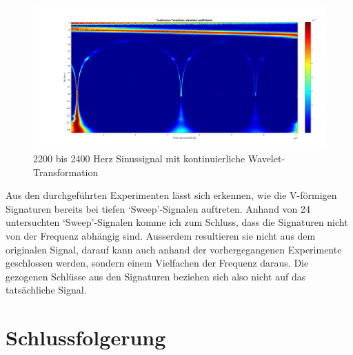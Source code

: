 \begin{refsection}
\begin{figure}[h]
	\includegraphics[width=0.9\linewidth]{papers/meteor/images/anomalie/sweep/cwt_2200to2400hz.png}
	\caption{2200 bis 2400 Herz Sinussignal mit kontinuierliche Wavelet-Transformation}
	\label{fig:cwt_anomalie_beam_2}
\end{figure}
Aus den durchgeführten Experimenten lässt sich erkennen, wie die V-förmigen Signaturen bereits bei tiefen `Sweep'-Signalen auftreten.
Anhand von 24 untersuchten `Sweep'-Signalen komme ich zum Schluss, dass die Signaturen nicht von der Frequenz abhängig sind.
Ausserdem resultieren sie nicht aus dem originalen Signal, darauf kann auch anhand der vorhergegangenen Experimente geschlossen werden, sondern einem Vielfachen der Frequenz daraus. 
Die gezogenen Schlüsse aus den Signaturen beziehen sich also nicht auf das tatsächliche Signal.

\newpage
\section{Schlussfolgerung}


\end{refsection}
